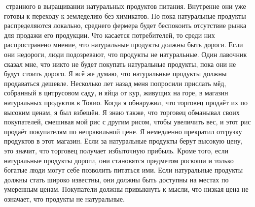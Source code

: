 \documentclass[a4paper]{book}
\begin{document}
странного в выращивании натуральных продуктов питания. Внутренне они уже готовы к
переходу к земледелию без химикатов. Но пока натуральные продукты распределяются
локально, среднего фермера будет беспокоить отсутствие рынка для продажи его продукции.
Что касается потребителей, то среди них распространено мнение, что натуральные
продукты должны быть дороги. Если они недороги, люди подозревают, что продукты не
натуральные. Один лавочник сказал мне, что никто не будет покупать натуральные продукты,
пока они не будут стоить дорого.
Я всё же думаю, что натуральные продукты должны продаваться дешевле. Несколько лет
назад меня попросили прислать мёд, собранный в цитрусовом саду, и яйца от кур, живущих
на горе, в магазин натуральных продуктов в Токио. Когда я обнаружил, что торговец продаёт
их по высоким ценам, я был взбешён. Я знаю также, что торговец обманывал своих
покупателей, смешивая мой рис с другим рисом, чтобы увеличить вес, и этот рис продаёт
покупателям по неправильной цене. Я немедленно прекратил отгрузку продуктов в этот
магазин.
Если за натуральные продукты берут высокую цену, это значит, что торговец получает
избыточную прибыль. Кроме того, если натуральные продукты дороги, они становятся
предметом роскоши и только богатые люди могут себе позволить питаться ими.
Если натуральные продукты должны стать широко известны, они должны быть
доступны на местах по умеренным ценам. Покупатели должны привыкнуть к мысли, что
низкая цена не означает, что продукты не натуральные.
\end{document}
